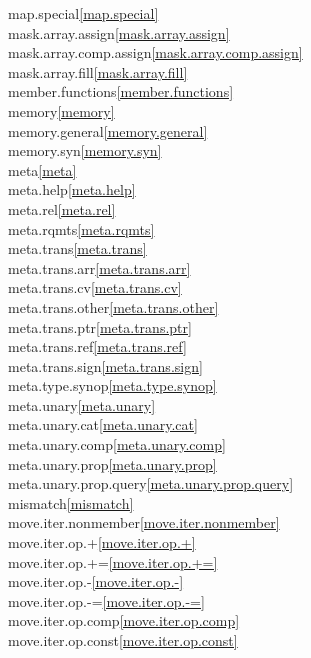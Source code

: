 \begin{multicols}{2}
map.special\quad\ref{map.special}\\
mask.array.assign\quad\ref{mask.array.assign}\\
mask.array.comp.assign\quad\ref{mask.array.comp.assign}\\
mask.array.fill\quad\ref{mask.array.fill}\\
member.functions\quad\ref{member.functions}\\
memory\quad\ref{memory}\\
memory.general\quad\ref{memory.general}\\
memory.syn\quad\ref{memory.syn}\\
meta\quad\ref{meta}\\
meta.help\quad\ref{meta.help}\\
meta.rel\quad\ref{meta.rel}\\
meta.rqmts\quad\ref{meta.rqmts}\\
meta.trans\quad\ref{meta.trans}\\
meta.trans.arr\quad\ref{meta.trans.arr}\\
meta.trans.cv\quad\ref{meta.trans.cv}\\
meta.trans.other\quad\ref{meta.trans.other}\\
meta.trans.ptr\quad\ref{meta.trans.ptr}\\
meta.trans.ref\quad\ref{meta.trans.ref}\\
meta.trans.sign\quad\ref{meta.trans.sign}\\
meta.type.synop\quad\ref{meta.type.synop}\\
meta.unary\quad\ref{meta.unary}\\
meta.unary.cat\quad\ref{meta.unary.cat}\\
meta.unary.comp\quad\ref{meta.unary.comp}\\
meta.unary.prop\quad\ref{meta.unary.prop}\\
meta.unary.prop.query\quad\ref{meta.unary.prop.query}\\
mismatch\quad\ref{mismatch}\\
move.iter.nonmember\quad\ref{move.iter.nonmember}\\
move.iter.op.+\quad\ref{move.iter.op.+}\\
move.iter.op.+=\quad\ref{move.iter.op.+=}\\
move.iter.op.-\quad\ref{move.iter.op.-}\\
move.iter.op.-=\quad\ref{move.iter.op.-=}\\
move.iter.op.comp\quad\ref{move.iter.op.comp}\\
move.iter.op.const\quad\ref{move.iter.op.const}\\

\end{multicols}
